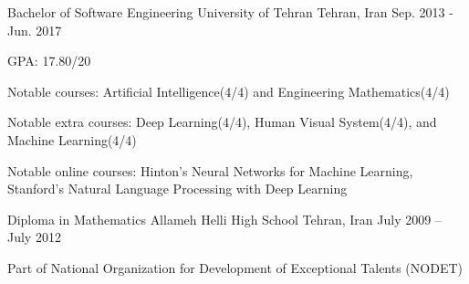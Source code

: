 

\begin{cventries}
  
  \cventry
    {Bachelor of Software Engineering} %
    {University of Tehran} %
    {Tehran, Iran} %
    {Sep. 2013 - Jun. 2017} %
    {
      \begin{cvitems} %
        \item {GPA: 17.80/20}
        \item {Notable courses: Artificial Intelligence(4/4) and Engineering Mathematics(4/4)}
        \item {Notable extra courses: Deep Learning(4/4), Human Visual System(4/4), and Machine Learning(4/4)}
        \item {Notable online courses: Hinton's Neural Networks for Machine Learning, Stanford's Natural Language Processing with Deep Learning}
      \end{cvitems}
    }
    
  \cventry
  	{Diploma in Mathematics}
  	{Allameh Helli High School}
  	{Tehran, Iran}
  	{July 2009 – July 2012}
  	{
      \begin{cvitems} %
        \item {Part of National Organization for Development of Exceptional Talents (NODET)}
      \end{cvitems}
    }

\end{cventries}
